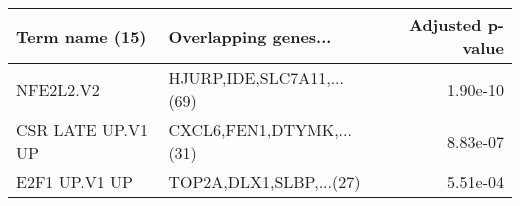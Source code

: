 \begin{tabular}{llr}
\toprule
   Term name (15) &      Overlapping genes... &  Adjusted p-value \\
\midrule
        NFE2L2.V2 & HJURP,IDE,SLC7A11,...(69) &          1.90e-10 \\
CSR LATE UP.V1 UP &  CXCL6,FEN1,DTYMK,...(31) &          8.83e-07 \\
    E2F1 UP.V1 UP &   TOP2A,DLX1,SLBP,...(27) &          5.51e-04 \\
\bottomrule
\end{tabular}

